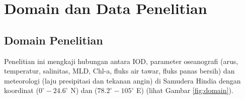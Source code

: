 \vspace{1.5pc}
\section[Domain dan Data Penelitian]{Domain dan Data Penelitian}
\begin{spacing}{1.5}
	\subsection[Domain Penelitian]{Domain Penelitian}
	Penelitian ini mengkaji hubungan antara IOD, parameter oseanografi (arus, temperatur, salinitas, MLD, Chl-a, fluks air tawar, fluks panas bersih) dan meteorologi (laju presipitasi dan tekanan angin) di Samudera Hindia dengan koordinat ($0^\circ-24.6^\circ$ N) dan ($78.2^\circ-105^\circ$ E) (lihat Gambar \ref{fig:domain}).


\end{spacing}
